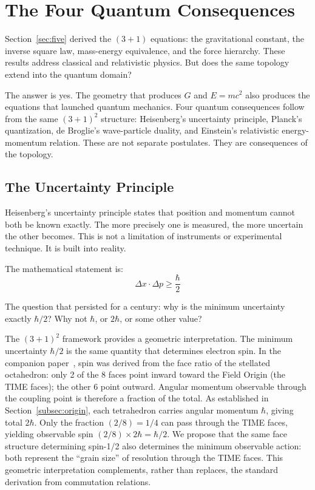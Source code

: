 \documentclass[aps,prd,preprint,superscriptaddress,showpacs,preprintnumbers,amsmath,amssymb,nofootinbib]{revtex4-2}
\begin{document}
\section{The Four Quantum Consequences}
\label{sec:four-more}

Section~\ref{sec:five} derived the $(3+1)$ equations: the gravitational constant, the inverse square law, mass-energy equivalence, and the force hierarchy. These results address classical and relativistic physics. But does the same topology extend into the quantum domain?

The answer is yes. The geometry that produces $G$ and $E = mc^2$ also produces the equations that launched quantum mechanics. Four quantum consequences follow from the same $(3+1)^2$ structure: Heisenberg's uncertainty principle, Planck's quantization, de Broglie's wave-particle duality, and Einstein's relativistic energy-momentum relation. These are not separate postulates. They are consequences of the topology.

\subsection{The Uncertainty Principle}
\label{subsec:uncertainty}

Heisenberg's uncertainty principle states that position and momentum cannot both be known exactly. The more precisely one is measured, the more uncertain the other becomes. This is not a limitation of instruments or experimental technique. It is built into reality.

The mathematical statement is:
\begin{equation}
\Delta x \cdot \Delta p \geq \frac{\hbar}{2}
\end{equation}

The question that persisted for a century: why is the minimum uncertainty exactly $\hbar/2$? Why not $\hbar$, or $2\hbar$, or some other value?

The $(3+1)^2$ framework provides a geometric interpretation. The minimum uncertainty $\hbar/2$ is the same quantity that determines electron spin. In the companion paper~\cite{paper6}, spin was derived from the face ratio of the stellated octahedron: only 2 of the 8 faces point inward toward the Field Origin (the TIME faces); the other 6 point outward. Angular momentum observable through the coupling point is therefore a fraction of the total. As established in Section~\ref{subsec:origin}, each tetrahedron carries angular momentum $\hbar$, giving total $2\hbar$. Only the fraction $(2/8) = 1/4$ can pass through the TIME faces, yielding observable spin $(2/8) \times 2\hbar = \hbar/2$. We propose that the same face structure determining spin-1/2 also determines the minimum observable action: both represent the ``grain size'' of resolution through the TIME faces. This geometric interpretation complements, rather than replaces, the standard derivation from commutation relations.
\end{document}

